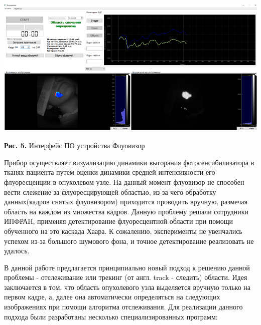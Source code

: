 \documentclass[a4paper,14pt]{extarticle}
\begin{document}
\begin{center}
    \includegraphics[scale = 0.8]{skrin.png}
    
    \textbf{Рис. 5.} Интерфейс ПО устройства Флуовизор
\end{center}

Прибор осуществляет визуализацию динамики выгорания фотосенсибилизатора в тканях пациента путем оценки динамики средней интенсивности его флуоресценции в опухолевом узле.
На данный момент флуовизор не способен вести слежение за флуоресцирующей областью, из-за чего обработку данных(кадров снятых флуовизором) приходится проводить вручную, размечая область на каждом из множества кадров.
Данную проблему решали сотрудники ИПФРАН, применяя детектирование флуоресцентной области при помощи обученного на это каскада Хаара. К сожалению, эксперименты не увенчались успехом из-за большого шумового фона, и точное детектирование реализовать не удалось.
 
В данной работе предлагается принципиально новый подход к решению данной проблемы - отслеживание или трекинг (от англ. track - следить) области. Идея заключается в том, что область опухолевого узла выделяется вручную только на первом кадре, а, далее она автоматически определяться на следующих изображениях при помощи алгоритма отслеживания. Для реализации данного подхода были разработаны несколько специализированных программ:
\end{document}
